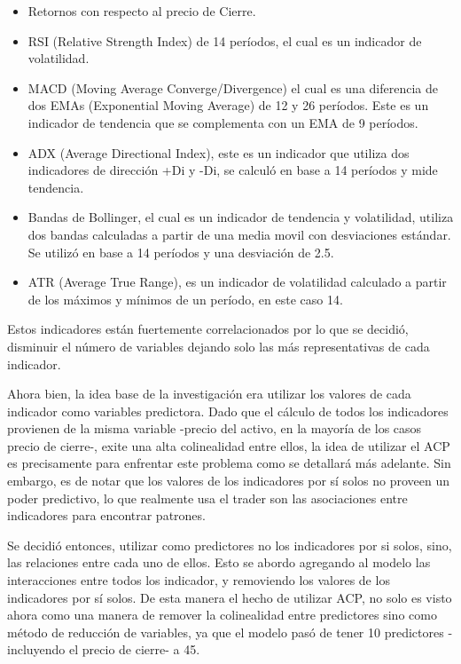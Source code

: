 \documentclass[a4paper,12pt]{Latex/Classes/PhDthesisPSnPDF}
\begin{document}
\begin{itemize}
\item Retornos con respecto al precio de Cierre.
\item RSI (Relative Strength Index) de 14 períodos, el cual es un indicador de volatilidad.
\item MACD (Moving Average Converge/Divergence) el cual es una diferencia de dos EMAs (Exponential Moving Average) de 12 y 26 períodos. Este es un indicador de tendencia que se complementa con un EMA de 9 períodos. 
\item ADX (Average Directional Index), este es un indicador que utiliza dos indicadores de dirección +Di y -Di, se calculó en base a 14 períodos y mide tendencia.
\item Bandas de Bollinger, el cual es un indicador de tendencia y volatilidad, utiliza dos bandas calculadas a partir de una media movil con desviaciones estándar. Se utilizó en base a 14 períodos y una desviación de 2.5.
\item ATR (Average True Range), es un indicador de volatilidad calculado a partir de los máximos y mínimos de un período, en este caso 14.
\end{itemize}

Estos indicadores están fuertemente correlacionados por lo que se decidió, disminuir el número de variables dejando solo las más representativas de cada indicador.

Ahora bien, la idea base de la investigación era utilizar los valores de cada indicador como variables predictora. Dado que el cálculo de todos los indicadores provienen de la misma variable -precio del activo, en la mayoría de los casos precio de cierre-, exite una alta colinealidad entre ellos, la idea de utilizar el ACP es precisamente para enfrentar este problema como se detallará más adelante. Sin embargo, es de notar que los valores de los indicadores por sí solos no proveen un poder predictivo, lo que realmente usa el trader son las asociaciones entre indicadores para encontrar patrones. 

Se decidió entonces, utilizar como predictores no los indicadores por si solos, sino, las relaciones entre cada uno de ellos. Esto se abordo agregando al modelo las interacciones entre todos los indicador, y removiendo los valores de los indicadores por sí solos. De esta manera el hecho de utilizar ACP, no solo es visto ahora como una manera de remover la colinealidad entre predictores sino como método de reducción de variables, ya que el modelo pasó de tener 10 predictores -incluyendo el precio de cierre- a 45.
\end{document}
